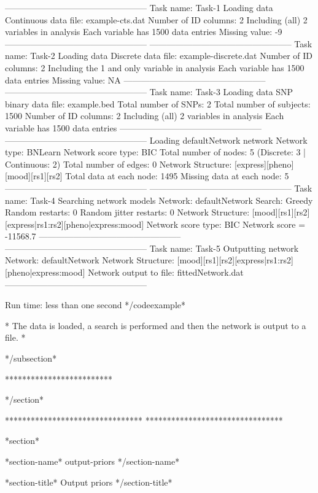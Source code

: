 -------------------------------------------------- Task name: Task-1 Loading data Continuous data file: example-cts.dat Number of ID columns: 2 Including (all) 2 variables in analysis Each variable has 1500 data entries Missing value: -9 -------------------------------------------------- -------------------------------------------------- Task name: Task-2 Loading data Discrete data file: example-discrete.dat Number of ID columns: 2 Including the 1 and only variable in analysis Each variable has 1500 data entries Missing value: NA -------------------------------------------------- -------------------------------------------------- Task name: Task-3 Loading data SNP binary data file: example.bed Total number of SNPs: 2 Total number of subjects: 1500 Number of ID columns: 2 Including (all) 2 variables in analysis Each variable has 1500 data entries -------------------------------------------------- -------------------------------------------------- Loading defaultNetwork network Network type: BNLearn Network score type: BIC Total number of nodes: 5 (Discrete: 3 | Continuous: 2) Total number of edges: 0 Network Structure: [express][pheno][mood][rs1][rs2] Total data at each node: 1495 Missing data at each node: 5 -------------------------------------------------- -------------------------------------------------- Task name: Task-4 Searching network models Network: defaultNetwork Search: Greedy Random restarts: 0 Random jitter restarts: 0 Network Structure: [mood][rs1][rs2][express|rs1:rs2][pheno|express:mood] Network score type: BIC Network score = -11568.7 -------------------------------------------------- -------------------------------------------------- Task name: Task-5 Outputting network Network: defaultNetwork Network Structure: [mood][rs1][rs2][express|rs1:rs2][pheno|express:mood] Network output to file: fittedNetwork.dat --------------------------------------------------

Run time: less than one second */codeexample*

* The data is loaded, a search is performed and then the network is output to a file. *


*/subsection*

*************************

*/section*

******************************** ********************************

*section*

*section-name* output-priors */section-name*

*section-title* Output priors */section-title*

